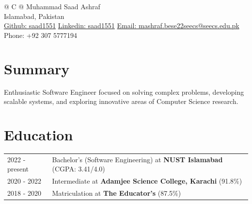 \documentclass[a4paper,9pt]{extarticle}
\begin{document}
\pagestyle{empty} 



\begin{tabularx}{\linewidth}{@{} C @{}}
\Huge{Muhammad Saad Ashraf} \\[7.5pt]
Islamabad, Pakistan \\
\href{https://github.com/saad1551}{Github: saad1551}\hspace{1em}
\href{https://linkedin.com/in/saadashraf380715222}{Linkedin: saad1551}\hspace{1em}
\href{mailto:mashraf.bese22seecs@seecs.edu.pk}{Email: mashraf.bese22seecs@seecs.edu.pk}\hspace{1em}
Phone: +92 307 5777194 \\
\end{tabularx}






\section{Summary}
Enthusiastic Software Engineer focused on solving complex problems, developing scalable systems, and exploring innovative areas of Computer Science research.


\section{Education}
\begin{tabularx}{\linewidth}{@{}l X@{}}	
2022 - present & Bachelor's (Software Engineering) at \textbf{NUST Islamabad} \hfill \normalsize (CGPA: 3.41/4.0) \\

2020 - 2022 & Intermediate at \textbf{Adamjee Science College, Karachi} \hfill \normalsize (91.8\%) \\

2018 - 2020 & Matriculation at \textbf{The Educator's} \hfill \normalsize (87.5\%) \\
\end{tabularx}
\end{document}
